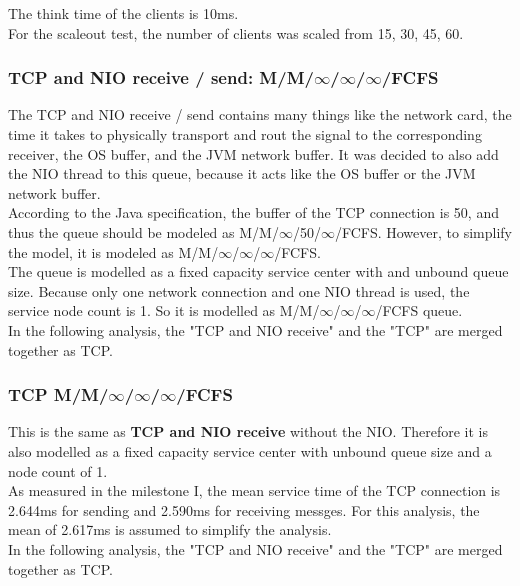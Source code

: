 \documentclass[a4paper]{article}
\begin{document}
\noindent The think time of the clients is 10ms.\\

For the scaleout test, the number of clients was scaled from 15, 30, 45, 60.

\subsubsection{TCP and NIO receive / send: M/M/$\infty$/$\infty$/$\infty$/FCFS}

The TCP and NIO receive / send contains many things like the network card, the time it takes to physically transport and rout the signal to the corresponding receiver, the OS buffer, and the JVM network buffer. It was decided to also add the NIO thread to this queue, because it acts like the OS buffer or the JVM network buffer.\\

\noindent According to the Java specification, the buffer of the TCP connection is 50, and thus the queue should be modeled as M/M/$\infty$/50/$\infty$/FCFS. However, to simplify the model, it is modeled as M/M/$\infty$/$\infty$/$\infty$/FCFS.\\

\noindent The queue is modelled as a fixed capacity service center with and unbound queue size. Because only one network connection and one NIO thread is used, the service node count is 1. So it is modelled as M/M/$\infty$/$\infty$/$\infty$/FCFS queue.\\

\noindent In the following analysis, the "TCP and NIO receive" and the "TCP" are merged together as TCP.

\subsubsection{TCP M/M/$\infty$/$\infty$/$\infty$/FCFS}

This is the same as \textbf{TCP and NIO receive} without the NIO. Therefore it is also modelled as a fixed capacity service center with unbound queue size and a node count of 1.\\

\noindent As measured in the milestone I, the mean service time of the TCP connection is 2.644ms for sending and 2.590ms for receiving messges. For this analysis, the mean of 2.617ms is assumed to simplify the analysis.\\

\noindent In the following analysis, the "TCP and NIO receive" and the "TCP" are merged together as TCP.
\end{document}
